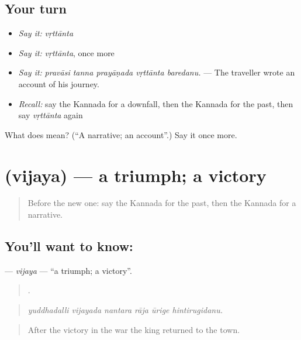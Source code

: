 \subsection*{Your turn}
\begin{itemize}
\raggedright
  \item \emph{Say it:} \emph{vṛttānta}
  \item \emph{Say it:} \emph{vṛttānta}, once more
  \item \emph{Say it:} \emph{pravāsi tanna prayāṇada vṛttānta baredanu.} — The traveller wrote an account of his journey.
  \item \emph{Recall:} say the Kannada for a downfall, then the Kannada for the past, then say \emph{vṛttānta} again
\end{itemize}

\begin{tcolorbox}[breakable,colback=teal!4,colframe=teal!35!black,title={Before you move on}]
What does  mean? (\textquotedblleft{}A narrative; an account\textquotedblright{}.) Say it once more.
\end{tcolorbox}
\section[\texorpdfstring{\kn{ವಿಜಯ} (vijaya)}{ವಿಜಯ (vijaya)}]{ (vijaya) — a triumph; a victory}

\label{lesson:KA-C373-vijaya}



\begin{quote}
Before the new one: say the Kannada for the past, then the Kannada for a narrative.
\end{quote}

\subsection*{You'll want to know: }
\textbf{} — \emph{vijaya} — \textquotedblleft{}a triumph; a victory\textquotedblright{}.

\begin{quote}
     .
\end{quote}

\begin{quote}
\emph{yuddhadalli vijayada nantara rāja ūrige hintirugidanu.}
\end{quote}

\begin{quote}
After the victory in the war the king returned to the town.
\end{quote}

